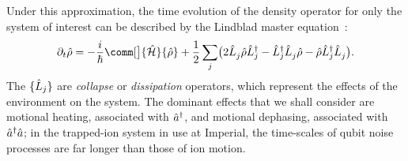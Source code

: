 Under this approximation, the time evolution of the density operator for only the system of interest can be described by the Lindblad master equation~\cite{Manzano2020}:
\begin{equation}\label{eq:qi-lindblad-master}
\partial_t\op\rho = -\frac i\hbar\comm[\big]{\H}{\op\rho} + \frac12\sum_j\bigl(2\op L_j^{}\op\rho\op L_j^{\smash\dagger} - \op L_j^{\smash\dagger}\op L_j^{}\op\rho - \op\rho\op L_j^{\smash\dagger}\op L_j^{}\bigr).
\end{equation}
The $\{\hat{L}_j\}$ are \emph{collapse} or \emph{dissipation} operators, which represent the effects of the environment on the system.
The dominant effects that we shall consider are motional heating, associated with $\hat{a}^\dagger$, and motional dephasing, associated with $\hat{a}^\dagger\hat{a}$; in the trapped-ion system in use at Imperial, the time-scales of qubit noise processes are far longer than those of ion motion.

